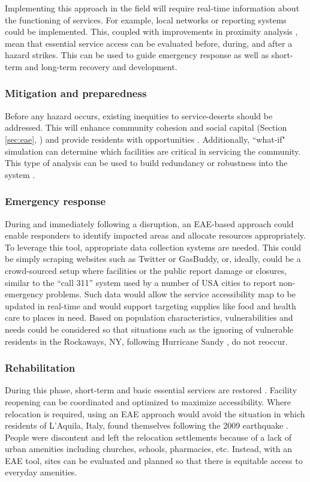 \documentclass[onecolumn,doublespacing]{risa}
\let \citeA \textcite
\let \cite \parencite
\begin{document}
Implementing this approach in the field will require real-time information about the functioning of services.
For example, local networks or reporting systems could be implemented.
This, coupled with improvements in proximity analysis \cite{Logan2017-fr, noel2019-pypi}, mean that essential service access can be evaluated before, during, and after a hazard strikes.
This can be used to guide emergency response as well as short-term and long-term recovery and development. 

\subsubsection{Mitigation and preparedness}
Before any hazard occurs, existing inequities to service-deserts should be addressed.
This will enhance community cohesion and social capital (Section \ref{sec:eae}, \citeA{Dempsey2011-og}) and provide residents with opportunities \cite{Cutter2010-vg}.
Additionally, ``what-if" simulation can determine which facilities are critical in servicing the community. 
This type of analysis can be used to build redundancy or robustness into the system \cite{Wardekker2010-hw}.

\subsubsection{Emergency response}
During and immediately following a disruption, an EAE-based approach could enable responders to identify impacted areas and allocate resources appropriately. 
To leverage this tool, appropriate data collection systems are needed. 
This could be simply scraping websites such as Twitter or GasBuddy, or, ideally, could be a crowd-sourced setup where facilities or the public report damage or closures, similar to the ``call 311'' system used by a number of USA cities to report non-emergency problems.
Such data would allow the service accessibility map to be updated in real-time and would support targeting supplies like food and health care to places in need. 
Based on population characteristics, vulnerabilities and needs could be considered so that situations such as the ignoring of vulnerable residents in the Rockaways, NY, following Hurricane Sandy \cite{Subaiya2014-qx}, do not reoccur. 

\subsubsection{Rehabilitation} 
During this phase, short-term and basic essential services are restored \cite{Resendiz-Vazquez2019-ol}. 
Facility reopening can be coordinated and optimized to maximize accessibility.
Where relocation is required, using an EAE approach would avoid the situation in which residents of L'Aquila, Italy, found themselves following the 2009 earthquake \cite{Contreras2017-yq}.
People were discontent and left the relocation settlements because of a lack of urban amenities including churches, schools, pharmacies, etc. 
Instead, with an EAE tool, sites can be evaluated and planned so that there is equitable access to everyday amenities.
\end{document}
